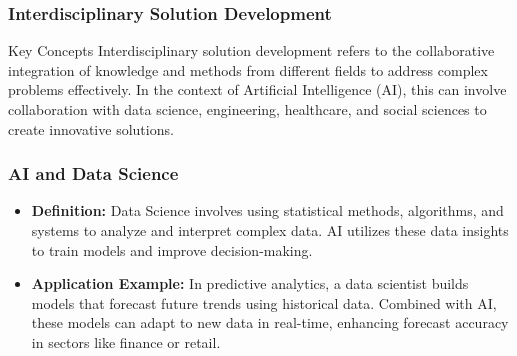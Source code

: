 \documentclass[aspectratio=169]{beamer}
\begin{document}
\begin{frame}
    \frametitle{Interdisciplinary Solution Development}
    \begin{block}{Key Concepts}
        Interdisciplinary solution development refers to the collaborative integration of knowledge and methods from different fields to address complex problems effectively. In the context of Artificial Intelligence (AI), this can involve collaboration with data science, engineering, healthcare, and social sciences to create innovative solutions.
    \end{block}
\end{frame}

\begin{frame}
    \frametitle{AI and Data Science}
    \begin{itemize}
        \item \textbf{Definition:} 
            Data Science involves using statistical methods, algorithms, and systems to analyze and interpret complex data. AI utilizes these data insights to train models and improve decision-making.
        \item \textbf{Application Example:} 
            In predictive analytics, a data scientist builds models that forecast future trends using historical data. Combined with AI, these models can adapt to new data in real-time, enhancing forecast accuracy in sectors like finance or retail.
    \end{itemize}
\end{frame}
\end{document}
